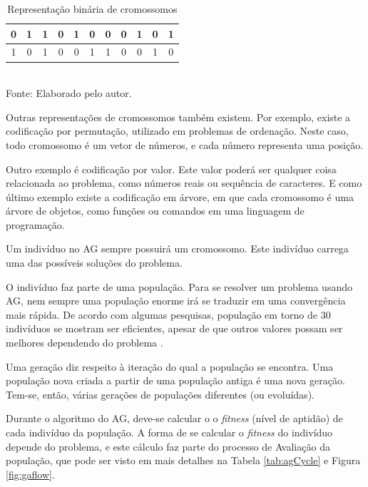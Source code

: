 \documentclass[
	12pt,					%
	openright,				%
	oneside,				%
	a4paper,				%
	bibjustif,				%
	chapter=TITLE,			%
	english,				%
	brazil,					%
	]{abntex2}
\newcommand{\source}[1]{\small Fonte: {#1}}
\begin{document}
	\begin{table}[ht]
		\caption{Representação binária de cromossomos}
		\centering
		\begin{tabular}{c c c c c c c c c c c}
			\hline 
			0 & 1 & 1 & 0 & 1 & 0 & 0 & 0 & 1 & 0 & 1\\ 
			\hline 
			1 & 0 & 1 & 0 & 0 & 1 & 1 & 0 & 0 & 1 & 0\\ 
			\hline 
		\end{tabular} \\
		\vspace{3mm}
		\source{Elaborado pelo autor.}
		\label{tab:cromosome}
	\end{table}
	
	Outras representações de cromossomos também existem.
	Por exemplo, existe a codificação por permutação,
	utilizado em problemas de ordenação.
	Neste caso, todo cromossomo é um vetor de números,
	e cada número representa uma posição.
	
	Outro exemplo é codificação por valor.
	Este valor poderá ser qualquer coisa relacionada ao problema,
	como números reais ou sequência de caracteres.
	E como último exemplo existe a codificação em árvore,
	em que cada cromossomo é uma árvore de objetos,
	como funções ou comandos em uma linguagem de programação.
	
	Um indivíduo no AG sempre possuirá um cromossomo.
	Este indivíduo carrega uma das possíveis soluções do problema.
	
	O indivíduo faz parte de uma população.
	Para se resolver um problema usando AG,
	nem sempre uma população enorme irá se traduzir em uma convergência mais rápida.
	De acordo com algumas pesquisas,
	população em torno de 30 indivíduos se mostram ser eficientes,
	apesar de que outros valores possam ser melhores dependendo do problema
	\cite{obitko}.
	
	Uma geração diz respeito à iteração do qual a população se encontra.
	Uma população nova criada a partir de uma população antiga é uma nova geração.
	Tem-se, então, várias gerações de populações diferentes (ou evoluídas).
	
	Durante o algoritmo do AG, deve-se calcular o o \textit{fitness} (nível de aptidão) de cada indivíduo da população.
	A forma de se calcular o \textit{fitness} do indivíduo depende do problema,
	e este cálculo faz parte do processo de Avaliação da população,
	que pode ser visto em mais detalhes na Tabela \ref{tab:agCycle} e Figura \ref{fig:gaflow}.
	
\end{document}
